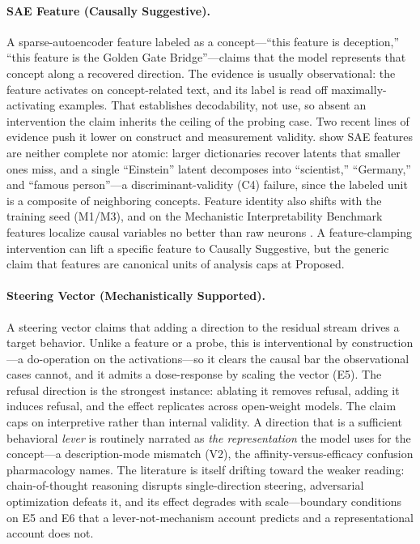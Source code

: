 \documentclass{article}
\begin{document}
\paragraph{SAE Feature (Causally Suggestive).} A sparse-autoencoder feature labeled as a concept---``this feature is deception,'' ``this feature is the Golden Gate Bridge''---claims that the model represents that concept along a recovered direction. The evidence is usually observational: the feature activates on concept-related text, and its label is read off maximally-activating examples. That establishes decodability, not use, so absent an intervention the claim inherits the ceiling of the probing case. Two recent lines of evidence push it lower on construct and measurement validity. \citet{leask2025canonical} show SAE features are neither complete nor atomic: larger dictionaries recover latents that smaller ones miss, and a single ``Einstein'' latent decomposes into ``scientist,'' ``Germany,'' and ``famous person''---a discriminant-validity (C4) failure, since the labeled unit is a composite of neighboring concepts. Feature identity also shifts with the training seed (M1/M3), and on the Mechanistic Interpretability Benchmark features localize causal variables no better than raw neurons \citep{mueller2025mib}. A feature-clamping intervention can lift a specific feature to Causally Suggestive, but the generic claim that features are canonical units of analysis caps at Proposed.

\paragraph{Steering Vector (Mechanistically Supported).} A steering vector claims that adding a direction to the residual stream drives a target behavior. Unlike a feature or a probe, this is interventional by construction---a $\mathrm{do}$-operation on the activations---so it clears the causal bar the observational cases cannot, and it admits a dose-response by scaling the vector (E5). The refusal direction \citep{arditi2024refusal} is the strongest instance: ablating it removes refusal, adding it induces refusal, and the effect replicates across open-weight models. The claim caps on interpretive rather than internal validity. A direction that is a sufficient behavioral \emph{lever} is routinely narrated as \emph{the representation} the model uses for the concept---a description-mode mismatch (V2), the affinity-versus-efficacy confusion pharmacology names. The literature is itself drifting toward the weaker reading: chain-of-thought reasoning disrupts single-direction steering, adversarial optimization defeats it, and its effect degrades with scale---boundary conditions on E5 and E6 that a lever-not-mechanism account predicts and a representational account does not.
\end{document}
